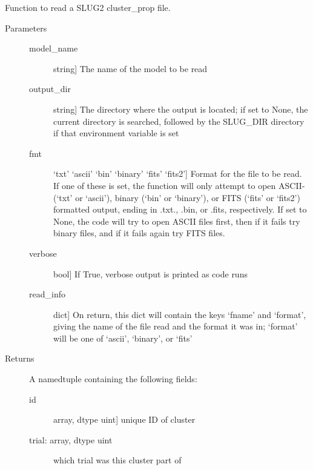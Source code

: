 \documentclass[letterpaper,10pt,english]{sphinxmanual}
\begin{document}

\begin{fulllineitems}
\label{slugpy:slugpy.read_cluster_prop}
Function to read a SLUG2 cluster\_prop file.
\begin{description}
\item[{Parameters}] \leavevmode\begin{description}
\item[{model\_name}] \leavevmode{[}string{]}
The name of the model to be read

\item[{output\_dir}] \leavevmode{[}string{]}
The directory where the output is located; if set to None,
the current directory is searched, followed by the SLUG\_DIR
directory if that environment variable is set

\item[{fmt}] \leavevmode{[}`txt' \textbar{} `ascii' \textbar{} `bin' \textbar{} `binary' \textbar{} `fits' \textbar{} `fits2'{]}
Format for the file to be read. If one of these is set, the
function will only attempt to open ASCII-(`txt' or `ascii'), 
binary (`bin' or `binary'), or FITS (`fits' or `fits2')
formatted output, ending in .txt., .bin, or .fits,
respectively. If set to None, the code will try to open
ASCII files first, then if it fails try binary files, and if
it fails again try FITS files.

\item[{verbose}] \leavevmode{[}bool{]}
If True, verbose output is printed as code runs

\item[{read\_info}] \leavevmode{[}dict{]}
On return, this dict will contain the keys `fname' and
`format', giving the name of the file read and the format it
was in; `format' will be one of `ascii', `binary', or `fits'

\end{description}

\item[{Returns}] \leavevmode
A namedtuple containing the following fields:
\begin{description}
\item[{id}] \leavevmode{[}array, dtype uint{]}
unique ID of cluster

\item[{trial: array, dtype uint}] \leavevmode
which trial was this cluster part of


\end{description}
\end{description}
\end{fulllineitems}
\end{document}
